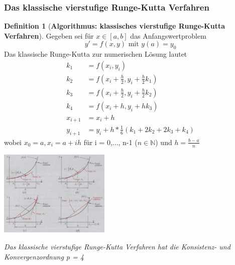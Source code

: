 \documentclass{article}
\newenvironment{Figure}
	{\par\medskip\noindent\minipage{\linewidth}}
	{\endminipage\par\medskip}
\theoremstyle{satz}
\theoremstyle{definition}
\newtheorem{definition}{Definition}
\begin{document}
\subsubsection{Das klassische vierstufige Runge-Kutta Verfahren}
\begin{tcolorbox}
\begin{definition}[\textbf{Algorithmus: klassisches vierstufige Runge-Kutta Verfahren}]
Gegeben sei für $x \in [a,b]$ das Anfangswertproblem
\begin{equation}
y' = f(x,y) \textrm{ mit } y(a) = y_0
\end{equation}
Das klassische Runge-Kutta zur numerischen Lösung lautet
\begin{equation}
\begin{split}
k_1 &= f(x_i, y_i)\\
k_2 &= f(x_i + \frac{h}{2}, y_i + \frac{h}{2}k_1)\\
k_3 &= f(x_i + \frac{h}{2}, y_i + \frac{h}{2}k_2)\\
k_4 &= f(x_i + h, y_i + h k_3)\\
x_{i+1} &= x_i + h\\
y_{i+1} &= y_i + h*\frac{1}{6}(k_1 + 2k_2 + 2k_3 + k_4) 
\end{split}
\end{equation}
wobei $x_0 = a, x_i = a + ih$ für i = 0,..., n-1 ($n \in \mathbb{N}$) und $h = \frac{b-a}{n}$
\end{definition}
\end{tcolorbox}
\begin{Figure}
\centering
\includegraphics[width=200px]{img/vierfachesRungeKuttaVerfahren.png}
	\label{fig:Klassisches vierstufiges Runge-Kutta-Verfahren}
\end{Figure}
\textit{Das klassische vierstufige Runge-Kutta Verfahren hat die Konsistenz- und Konvergenzordnung p = 4}\\
\end{document}

